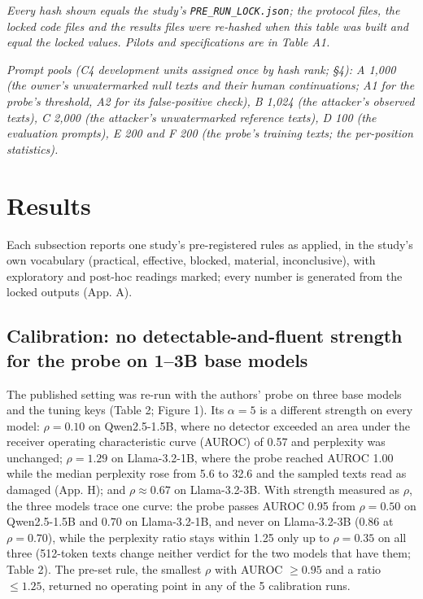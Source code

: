 \documentclass[11pt,letterpaper]{article}
\begin{document}
\emph{Every hash shown equals the study's \texttt{PRE\_\allowbreak{}RUN\_\allowbreak{}LOCK.\allowbreak{}json}; the protocol files, the locked code files and the results files were re-hashed when this table was built and equal the locked values. Pilots and specifications are in Table A1.}

\emph{Prompt pools (C4 development units assigned once by hash rank; \S{}4): A 1,000 (the owner's unwatermarked null texts and their human continuations; A1 for the probe's threshold, A2 for its false-positive check), B 1,024 (the attacker's observed texts), C 2,000 (the attacker's unwatermarked reference texts), D 100 (the evaluation prompts), E 200 and F 200 (the probe's training texts; the per-position statistics).}

\hypertarget{results}{%
\section{Results}\label{results}}

Each subsection reports one study's pre-registered rules as applied, in the study's own vocabulary (practical, effective, blocked, material, inconclusive), with exploratory and post-hoc readings marked; every number is generated from the locked outputs (App. A).

\hypertarget{calibration-no-detectable-and-fluent-strength-for-the-probe-on-13b-base-models}{%
\subsection{Calibration: no detectable-and-fluent strength for the probe on 1--3B base models}\label{calibration-no-detectable-and-fluent-strength-for-the-probe-on-13b-base-models}}

The published setting was re-run with the authors' probe on three base models and the tuning keys (Table 2; Figure 1). Its \(\alpha = 5\) is a different strength on every model: \(\rho = 0.10\) on Qwen2.5-1.5B, where no detector exceeded an area under the receiver operating characteristic curve (AUROC) of 0.57 and perplexity was unchanged; \(\rho = 1.29\) on Llama-3.2-1B, where the probe reached AUROC 1.00 while the median perplexity rose from 5.6 to 32.6 and the sampled texts read as damaged (App. H); and \(\rho \approx 0.67\) on Llama-3.2-3B. With strength measured as \(\rho\), the three models trace one curve: the probe passes AUROC 0.95 from \(\rho = 0.50\) on Qwen2.5-1.5B and \(0.70\) on Llama-3.2-1B, and never on Llama-3.2-3B (0.86 at \(\rho = 0.70\)), while the perplexity ratio stays within 1.25 only up to \(\rho = 0.35\) on all three (512-token texts change neither verdict for the two models that have them; Table 2). The pre-set rule, the smallest \(\rho\) with AUROC \(\geq 0.95\) and a ratio \(\leq 1.25\), returned no operating point in any of the 5 calibration runs.
\end{document}
